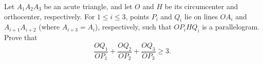 Let $A_{1}A_{2}A_{3}$ be an acute triangle, and let $O$ and $H$ be its circumcenter and orthocenter, respectively. For $1\leq i \leq 3$, points $P_{i}$ and $Q_{i}$ lie on lines $OA_{i}$ and $A_{i+1}A_{i+2}$ (where $A_{i+3}=A_{i}$), respectively, such that $OP_{i}HQ_{i}$ is a parallelogram. Prove that \[\frac{OQ_{1}}{OP_{1}}+\frac{OQ_{2}}{OP_{2}}+\frac{OQ_{3}}{OP_{3}}\geq 3.\]